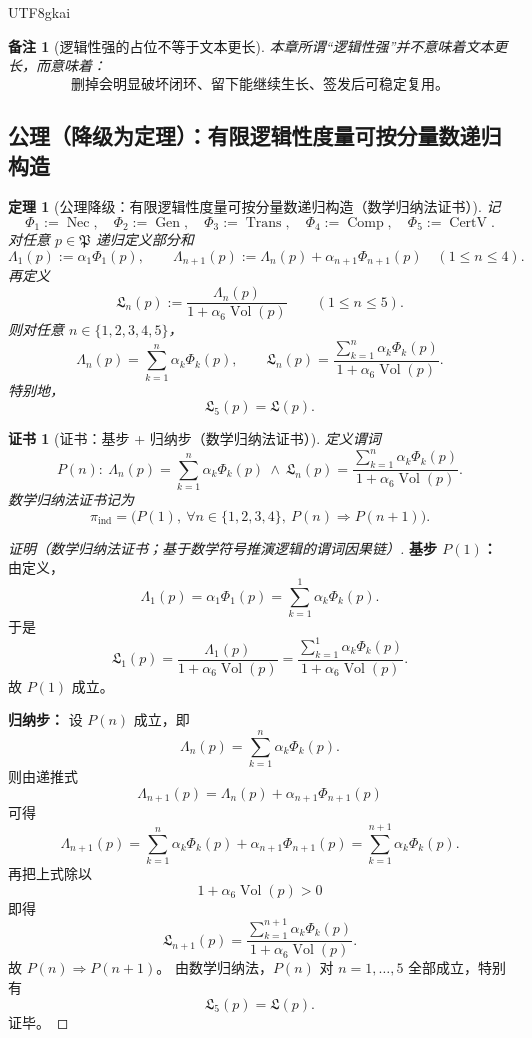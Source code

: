 \documentclass[12pt]{article}
\newtheorem{theorem}{定理}[section]
\newtheorem{remark}{备注}[section]
\newtheorem{Certificate}{证书}[section]
\begin{document}
\begin{CJK*}{UTF8}{gkai}
\begin{remark}[逻辑性强的占位不等于文本更长]
本章所谓“逻辑性强”并不意味着文本更长，而意味着：
\[
  \boxed{
    \text{删掉会明显破坏闭环、留下能继续生长、签发后可稳定复用。}
  }
\]
\end{remark}

\subsection{公理（降级为定理）：有限逻辑性度量可按分量数递归构造}
\label{subsec:tex37-ch16-axiom}

\begin{theorem}[公理降级：有限逻辑性度量可按分量数递归构造（数学归纳法证书）]
\label{thm:tex37-ch16-aggregation}
记
\[
  \Phi_1:=\operatorname{Nec},\quad
  \Phi_2:=\operatorname{Gen},\quad
  \Phi_3:=\operatorname{Trans},\quad
  \Phi_4:=\operatorname{Comp},\quad
  \Phi_5:=\operatorname{CertV}.
\]
对任意 $p\in\mathfrak P$ 递归定义部分和
\[
  \Lambda_1(p):=\alpha_1\Phi_1(p),
  \qquad
  \Lambda_{n+1}(p):=\Lambda_n(p)+\alpha_{n+1}\Phi_{n+1}(p)
  \quad (1\le n\le 4).
\]
再定义
\[
  \mathfrak L_n(p)
  :=
  \frac{\Lambda_n(p)}{1+\alpha_6\operatorname{Vol}(p)}
  \qquad (1\le n\le 5).
\]
则对任意 $n\in\{1,2,3,4,5\}$，
\[
  \Lambda_n(p)=\sum_{k=1}^{n}\alpha_k\Phi_k(p),
  \qquad
  \mathfrak L_n(p)=
  \frac{\sum_{k=1}^{n}\alpha_k\Phi_k(p)}{1+\alpha_6\operatorname{Vol}(p)}.
\]
特别地，
\[
  \mathfrak L_5(p)=\mathfrak L(p).
\]
\end{theorem}

\begin{Certificate}[证书：基步 + 归纳步（数学归纳法证书）]
\label{cert:tex37-ch16-aggregation}
定义谓词
\[
  P(n):\
  \Lambda_n(p)=\sum_{k=1}^{n}\alpha_k\Phi_k(p)
  \ \wedge\
  \mathfrak L_n(p)=
  \frac{\sum_{k=1}^{n}\alpha_k\Phi_k(p)}{1+\alpha_6\operatorname{Vol}(p)}.
\]
数学归纳法证书记为
\[
  \pi_{\mathrm{ind}}
  =
  \bigl(
    P(1),\
    \forall n\in\{1,2,3,4\},\ P(n)\Rightarrow P(n+1)
  \bigr).
\]
\end{Certificate}

\begin{proof}[证明（数学归纳法证书；基于数学符号推演逻辑的谓词因果链）]
\textbf{基步 $P(1)$：}
由定义，
\[
  \Lambda_1(p)=\alpha_1\Phi_1(p)
  =
  \sum_{k=1}^{1}\alpha_k\Phi_k(p).
\]
于是
\[
  \mathfrak L_1(p)
  =
  \frac{\Lambda_1(p)}{1+\alpha_6\operatorname{Vol}(p)}
  =
  \frac{\sum_{k=1}^{1}\alpha_k\Phi_k(p)}{1+\alpha_6\operatorname{Vol}(p)}.
\]
故 $P(1)$ 成立。

\textbf{归纳步：}
设 $P(n)$ 成立，即
\[
  \Lambda_n(p)=\sum_{k=1}^{n}\alpha_k\Phi_k(p).
\]
则由递推式
\[
  \Lambda_{n+1}(p)=\Lambda_n(p)+\alpha_{n+1}\Phi_{n+1}(p)
\]
可得
\[
  \Lambda_{n+1}(p)
  =
  \sum_{k=1}^{n}\alpha_k\Phi_k(p)+\alpha_{n+1}\Phi_{n+1}(p)
  =
  \sum_{k=1}^{n+1}\alpha_k\Phi_k(p).
\]
再把上式除以
\[
  1+\alpha_6\operatorname{Vol}(p)>0
\]
即得
\[
  \mathfrak L_{n+1}(p)
  =
  \frac{\sum_{k=1}^{n+1}\alpha_k\Phi_k(p)}{1+\alpha_6\operatorname{Vol}(p)}.
\]
故 $P(n)\Rightarrow P(n+1)$。
由数学归纳法，$P(n)$ 对 $n=1,\dots,5$ 全部成立，特别有
\[
  \mathfrak L_5(p)=\mathfrak L(p).
\]
证毕。
\end{proof}


\end{CJK*}
\end{document}
